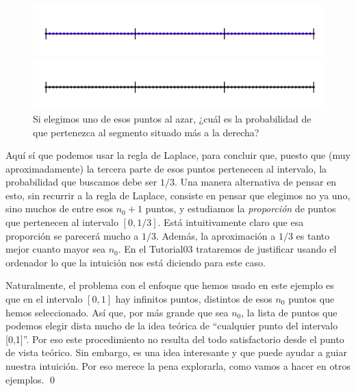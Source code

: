 \begin{ejemplo}
    \begin{figure}[h]
	\centering
	\begin{enColor}
	\includegraphics[width=12cm]{../fig/Cap03-EjemploProbabilidadGeometrica01.png}
	\end{enColor}
	\begin{bn}
	\includegraphics[width=12cm]{../fig/Cap03-EjemploProbabilidadGeometrica01-bn.png}
	\end{bn}
	\caption{Si elegimos uno de esos puntos al azar, ¿cuál es la probabilidad de que pertenezca al
    segmento situado más a la derecha?}
    \label{Cap03:fig:EjemploProbabilidadGeometricaElegirPuntoIntervalo}
    \end{figure}
Aquí sí que podemos usar la regla de Laplace, para concluir que, puesto que (muy aproximadamente) la tercera parte de esos puntos pertenecen al intervalo, la probabilidad que buscamos debe ser $1/3$. Una manera alternativa de pensar en esto, sin recurrir a la regla de Laplace, consiste en pensar que elegimos no ya uno, sino muchos de entre esos $n_0+1$ puntos, y estudiamos la {\em proporción} de puntos que pertenecen al intervalo $[0,1/3]$. Está intuitivamente claro que esa proporción se parecerá mucho a $1/3$. Además, la aproximación a $1/3$ es tanto mejor cuanto mayor sea $n_0$. En el Tutorial03 trataremos de justificar usando el ordenador lo que la intuición nos está diciendo para este caso.

Naturalmente, el problema con el enfoque que hemos usado en este ejemplo es que en el intervalo $[0,1]$ hay infinitos puntos, distintos de esos $n_0$ puntos que hemos seleccionado. Así que, por más grande que sea $n_0$, la lista de puntos que podemos elegir dista mucho de la idea teórica de ``cualquier punto del intervalo [0,1]''. Por eso este procedimiento no resulta del todo satisfactorio desde el punto de vista teórico. Sin embargo, es una idea interesante y que puede ayudar a guiar nuestra intuición. Por eso merece la pena explorarla, como vamos a hacer en otros ejemplos.
\qed
\end{ejemplo}
